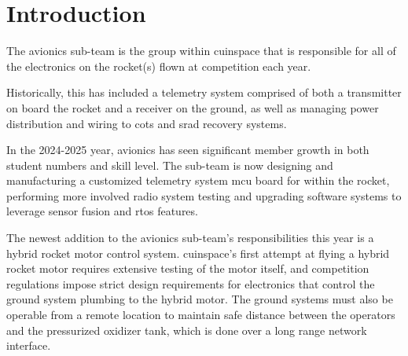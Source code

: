 \section{Introduction}

The avionics sub-team is the group within \gls{cuinspace} that is responsible for all of the electronics on the rocket(s) flown at competition each year.

Historically, this has included a telemetry system comprised of both a transmitter on board the rocket and a receiver on the ground, as well as managing power distribution and wiring to \gls{cots} and \gls{srad} recovery systems.

In the 2024-2025 year, avionics has seen significant member growth in both student numbers and skill level. The sub-team is now designing and manufacturing a customized telemetry system \gls{mcu} board for within the rocket, performing more involved radio system testing and upgrading software systems to leverage sensor fusion and \gls{rtos} features.

The newest addition to the avionics sub-team's responsibilities this year is a hybrid rocket motor control system. \gls{cuinspace}'s first attempt at flying a hybrid rocket motor requires extensive testing of the motor itself, and competition regulations impose strict design requirements for electronics that control the ground system plumbing to the hybrid motor. The ground systems must also be operable from a remote location to maintain safe distance between the operators and the pressurized oxidizer tank, which is done over a long range network interface.
